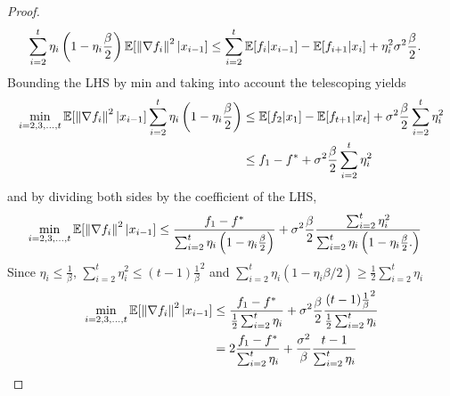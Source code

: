 \begin{proof}
    \begin{equation}
        \begin{aligned}
            \sum^{t}_{i=2} \eta_i \left( 1 - \eta_i \frac{\beta}{2}  \right)
            \mathbb E[\left\| \nabla f_i \right\|^2|x_{i - 1}]  &\leq \sum^{t}_{i=2} \mathbb E[f_i | x_{i - 1}] - \mathbb E[f_{i+1} | x_i] + \eta_i^2\sigma^2 \frac{\beta}{2}.
        \end{aligned}
    \end{equation}
    Bounding the LHS by min and taking into account the telescoping yields
    \begin{equation}
    \begin{aligned}
        \min_{i = 2, 3, \dots, t} \mathbb E[\left\| \nabla f_i \right\|^2|x_{i - 1}]
        \sum^{t}_{i=2} \eta_i \left( 1 - \eta_i \frac{\beta}{2}  \right)  &\leq
        \mathbb E[f_2 | x_1] - \mathbb E[f_{t+1} | x_t] + \sigma^2
        \frac{\beta}{2}\sum^{t}_{i=2} \eta_i^2 \\
        &\leq
       f_1 - f^* + \sigma^2 \frac{\beta}{2}\sum^{t}_{i=2} \eta_i^2
    \end{aligned}
    \end{equation}
    and by dividing both sides by the coefficient of the LHS,
    \begin{equation}
    \begin{aligned}
        \min_{i = 2, 3, \dots, t} \mathbb E[\left\| \nabla f_i \right\|^2|x_{i - 1}]
        &\leq
        \frac{f_1 - f^*}{\sum^{t}_{i=2} \eta_i \left( 1 - \eta_i \frac{\beta}{2}  \right)} + \sigma^2 \frac{\beta}{2}\frac{\sum^{t}_{i=2}
        \eta_i^2}{\sum^{t}_{i=2} \eta_i \left( 1 - \eta_i \frac{\beta}{2}.
        \right)}
    \end{aligned}
    \end{equation}
    Since $\eta_i \leq \frac{1}{\beta}$, $\sum_{i = 2}^t \eta_i^2 \leq (t-1)
    {\frac{1}{\beta} }^2$ and $\sum_{i=2}^t\eta_i(1 - \eta_i \beta / 2) \geq 
    \frac{1}{2}\sum_{i=2}^t\eta_i$
    \begin{equation}
    \begin{aligned}
        \min_{i = 2, 3, \dots, t} \mathbb E[\left\| \nabla f_i \right\|^2|x_{i - 1}]
        &\leq
        \frac{f_1 - f^*}{ \frac{1}{2} \sum^{t}_{i=2} \eta_i } + \sigma^2
        \frac{\beta}{2}\frac{(t-1)
        {\frac{1}{\beta} }^2}{ \frac{1}{2}\sum_{i=2}^t\eta_i} \\
        &=
        2\frac{f_1 - f^*}{ \sum^{t}_{i=2} \eta_i } + \frac{\sigma^2 }{\beta}\frac{t - 1}{ \sum_{i=2}^t\eta_i}
    \end{aligned}
    \end{equation}
\end{proof}
